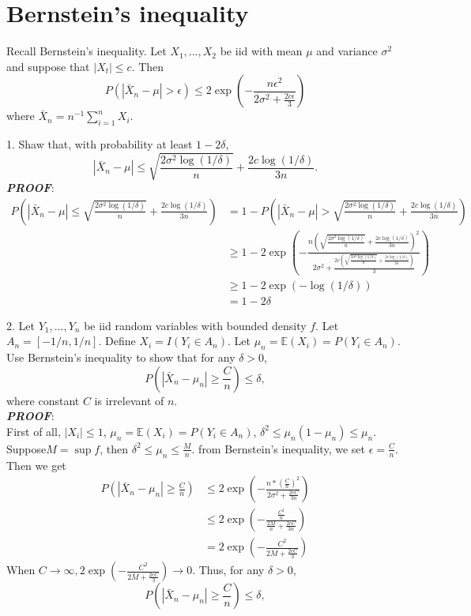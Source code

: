 \documentclass{article}
\theoremstyle{definition}
\theoremstyle{definition}
\theoremstyle{remark}
\begin{document}
\section*{Bernstein's inequality}

Recall Bernstein's inequality. Let $X_1,...,X_2$ be iid with mean $\mu$ and variance $\sigma^2$ and suppose that $|X_t|\leq c$. Then
\[
P(|\bar{X}_n-\mu|>\epsilon)\leq 2\exp\left(-\frac{n\epsilon^2}{2\sigma^2+\frac{2c\epsilon}{3}}\right)
\]
where $\bar{X}_n=n^{-1}\sum_{i=1}^n X_i$.

1. Shaw that, with probability at least $1-2\delta$,
\[
|\bar{X}_n-\mu| \leq \sqrt{\frac{2\sigma^2\log(1/\delta)}{n}}+\frac{2c\log(1/\delta)}{3n}.
\]
\emph{\textbf{PROOF}}:\\
\begin{equation}\nonumber
\begin{aligned}
P\left(|\bar{X}_n-\mu| \leq \sqrt{\frac{2\sigma^2\log(1/\delta)}{n}}+\frac{2c\log(1/\delta)}{3n}\right)&=1-P\left(|\bar{X}_n-\mu| >\sqrt{\frac{2\sigma^2\log(1/\delta)}{n}}+\frac{2c\log(1/\delta)}{3n}\right)\\
             &\geq 1- 2\exp\left(-\frac{n(\sqrt{\frac{2\sigma^2\log(1/\delta)}{n}}+\frac{2c\log(1/\delta)}{3n})^2}{2\sigma^2
             +\frac{2c(\sqrt{\frac{2\sigma^2\log(1/\delta)}{n}}+\frac{2c\log(1/\delta)}{3n})}{3}}\right)\\
            &\geq 1-2\exp\left(-\log(1/\delta)\right)\\
            &=1-2\delta
\end{aligned}
\end{equation}

2. Let $Y_1,...,Y_n$ be iid random variables with bounded density $f$. Let $A_n=[-1/n,1/n]$. Define $X_i=I(Y_i\in A_n)$. Let $\mu_n=\mathbb{E}(X_i)=P(Y_i\in A_n)$.
Use Bernstein's inequality to show that for any $\delta > 0$,
\[
P\left(|\bar{X}_n-\mu_n|\geq \frac{C}{n}\right)\leq \delta,
\]
where constant $C$ is irrelevant of $n$.\\
\emph{\textbf{PROOF}}:\\
First of all, $|X_i|\leq1$, $\mu_n=\mathbb{E}(X_i)=P(Y_i\in A_n)$, $\delta^2\leq\mu_n(1-\mu_n)\leq\mu_n$. Suppose$M = \sup f$, then $\delta^2\leq\mu_n\leq\frac{M}{n}$.
from Bernstein's inequality, we set $\epsilon=\frac{C}{n}$. Then we get
\begin{equation}\nonumber
\begin{aligned}
P\left(|\bar{X}_n-\mu_n|\ge\frac{C}{n}\right)&\leq2\exp\left(-\frac{n*(\frac{C}{n})^2}{2\sigma^2+\frac{2cC}{3n}}\right)\\
            &\leq2\exp\left(-\frac{\frac{C^2}{n}}{\frac{2M}{n}+\frac{2cC}{3n}}\right)\\
            &=2\exp\left(-\frac{C^2}{2M+\frac{2cC}{3}}\right)
\end{aligned}
\end{equation}
When $C\rightarrow\infty, 2\exp\left(-\frac{C^2}{2M+\frac{2cC}{3}}\right)\rightarrow 0$. Thus, for any $\delta > 0$,
\[
P\left(|\bar{X}_n-\mu_n|\geq \frac{C}{n}\right)\leq \delta,
\]
\end{document}
